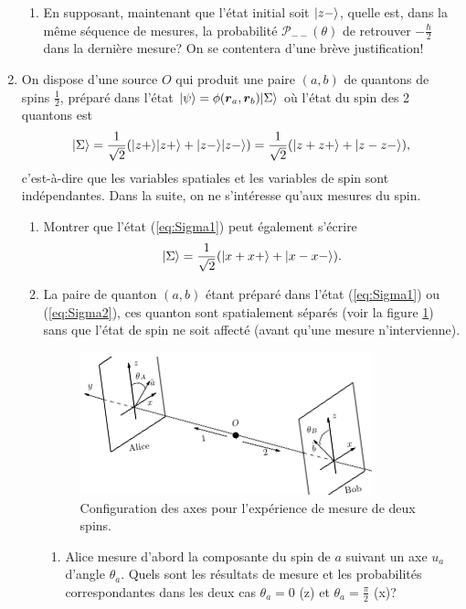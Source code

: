 \begin{enumerate}
\begin{enumerate}
\item En supposant, maintenant que l'état initial soit $\vert z-\rangle$, quelle est,
dans la même séquence de mesures, la probabilité $\mathcal{P}_{--}(\theta)$ de
retrouver $-\frac{\hbar}{2}$ dans la dernière mesure? On se contentera d'une
brève justification!
\end{enumerate}

\item On dispose d'une source $O$ qui produit une paire $(a,b)$ de quantons de
spins $\frac{1}{2}$, préparé dans l'état $\vert\psi\rangle=\phi(\boldsymbol{r}_a,\boldsymbol{r}_b)
\vert\Sigma\rangle$ où l'état du spin des 2 quantons est
\begin{equation}
 \vert\Sigma\rangle=\frac{1}{\sqrt{2}}(\vert z+\rangle\vert z+\rangle+\vert z-\rangle\vert z-\rangle)
 =\frac{1}{\sqrt{2}}(\vert z+z+\rangle+\vert z-z-\rangle),\label{eq:Sigma1}
\end{equation}
c'est-à-dire que les variables spatiales et les variables de spin sont
indépendantes. Dans la suite, on ne s'intéresse qu'aux mesures du spin.

\begin{enumerate}
 \item Montrer que l'état (\ref{eq:Sigma1}) peut également s'écrire
 \begin{equation}
 \vert\Sigma\rangle=\frac{1}{\sqrt{2}}(\vert x+x+\rangle+\vert x-x-\rangle).\label{eq:Sigma2}
\end{equation}

\item La paire de quanton $(a,b)$ étant préparé dans l'état (\ref{eq:Sigma1}) ou
(\ref{eq:Sigma2}), ces quanton sont spatialement séparés (voir la figure
\ref{fig:PaireAB}) sans que l'état de spin ne soit affecté (avant qu'une mesure
n'intervienne).

\begin{figure}[htbp]
 \centering
 \includegraphics[scale=1]{./graphics/ExoPaireAB.png}
 \caption{Configuration des axes pour l'expérience de mesure de deux spins.}
 \label{fig:PaireAB}
\end{figure}

\begin{enumerate}
 \item Alice mesure d'abord la composante du spin de $a$ suivant un axe $u_a$
d'angle $\theta_a$. Quels sont les résultats de mesure et les probabilités
correspondantes dans les deux cas $\theta_a=0$ (z) et $\theta_a=\frac{\pi}{2}$
(x)?


\end{enumerate}
\end{enumerate}
\end{enumerate}

